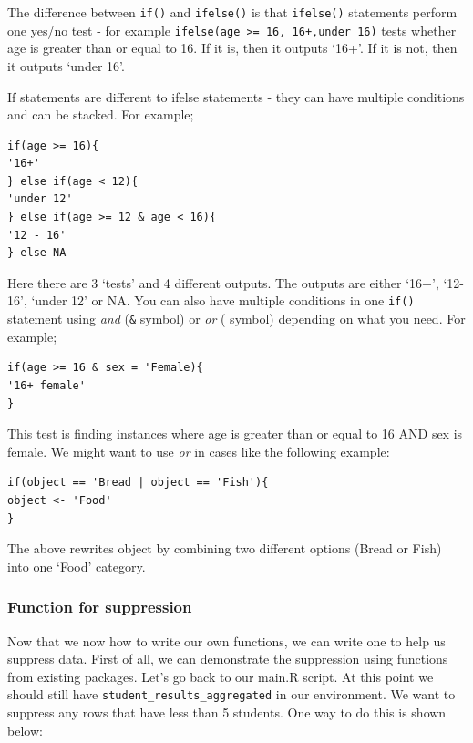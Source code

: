 \documentclass[
  12pt,
]{article}
\begin{document}
The difference between \texttt{if()} and \texttt{ifelse()} is that
\texttt{ifelse()} statements perform one yes/no test - for example
\texttt{ifelse(age\ \textgreater{}=\ 16,\ \textquotesingle{}16+\textquotesingle{},\textquotesingle{}under\ 16\textquotesingle{})}
tests whether age is greater than or equal to 16. If it is, then it
outputs `16+'. If it is not, then it outputs `under 16'.

If statements are different to ifelse statements - they can have
multiple conditions and can be stacked. For example;

\begin{verbatim}
if(age >= 16){
'16+'
} else if(age < 12){
'under 12'
} else if(age >= 12 & age < 16){
'12 - 16'
} else NA
\end{verbatim}

Here there are 3 `tests' and 4 different outputs. The outputs are either
`16+', `12-16', `under 12' or NA. You can also have multiple conditions
in one \texttt{if()} statement using \emph{and} (\texttt{\&} symbol) or
\emph{or} (\texttt{\textbar{}} symbol) depending on what you need. For
example;

\begin{verbatim}
if(age >= 16 & sex = 'Female){
'16+ female'
}
\end{verbatim}

This test is finding instances where age is greater than or equal to 16
AND sex is female. We might want to use \emph{or} in cases like the
following example:

\begin{verbatim}
if(object == 'Bread | object == 'Fish'){
object <- 'Food'
}
\end{verbatim}

The above rewrites object by combining two different options (Bread or
Fish) into one `Food' category.

\hypertarget{function-for-suppression}{%
\subsubsection{Function for
suppression}\label{function-for-suppression}}

Now that we now how to write our own functions, we can write one to help
us suppress data. First of all, we can demonstrate the suppression using
functions from existing packages. Let's go back to our main.R script. At
this point we should still have \texttt{student\_results\_aggregated} in
our environment. We want to suppress any rows that have less than 5
students. One way to do this is shown below:
\end{document}
